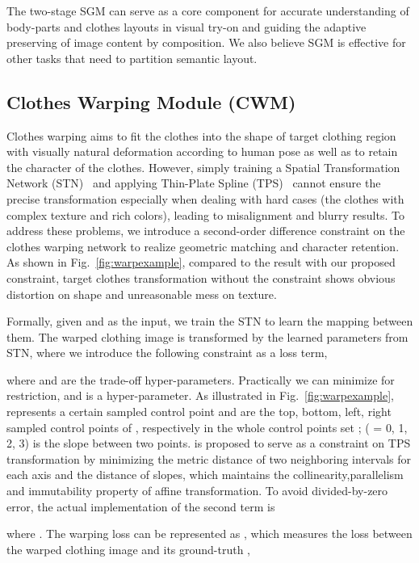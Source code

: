 \documentclass[10pt,twocolumn,letterpaper]{article}
\begin{document}
The two-stage SGM can serve as a core component for accurate understanding of body-parts and clothes layouts in visual try-on and guiding
the adaptive preserving of image content by composition. We also believe SGM is effective for other tasks that need to partition semantic layout.


\subsection{Clothes Warping Module (CWM)}

Clothes warping aims to fit the clothes into the shape of target clothing region with visually natural deformation according to human pose as well as to retain the character of the clothes.
However, simply training a Spatial Transformation Network (STN)~\cite{jaderberg2015spatial} and applying Thin-Plate Spline (TPS)~\cite{duchon1977splines}  cannot ensure the precise transformation especially when dealing with hard cases (\ie the clothes with complex texture and rich colors), leading to misalignment and blurry results. To address these problems, we introduce a second-order difference constraint on the clothes warping network to realize geometric matching and character retention. As shown in Fig.~\ref{fig:warpexample}, compared to the result with our proposed constraint, target clothes transformation without the constraint shows obvious distortion on shape and unreasonable mess on texture.

 


Formally, given  and  as the input, we train the STN to learn the mapping between them. The warped clothing  image  is transformed by the learned parameters from STN, where we introduce the following constraint  as a loss term,

 where  and  are the trade-off hyper-parameters. Practically we can minimize  for restriction, and  is a hyper-parameter. As illustrated in Fig.~\ref{fig:warpexample},  represents a certain sampled control point and  are the top, bottom, left, right sampled control points of , respectively in the whole control points set ;  ( = {0, 1, 2, 3}) is the slope between two points.
  is proposed to serve as a constraint on TPS transformation by minimizing the metric distance of two neighboring intervals for each axis and the distance of slopes, which
 maintains the collinearity,parallelism and immutability property of affine transformation. To avoid divided-by-zero error, the actual implementation of the second term is
 
where .
The warping loss can be represented as , which measures the loss between the warped clothing  image  and its ground-truth ,
 
\end{document}
